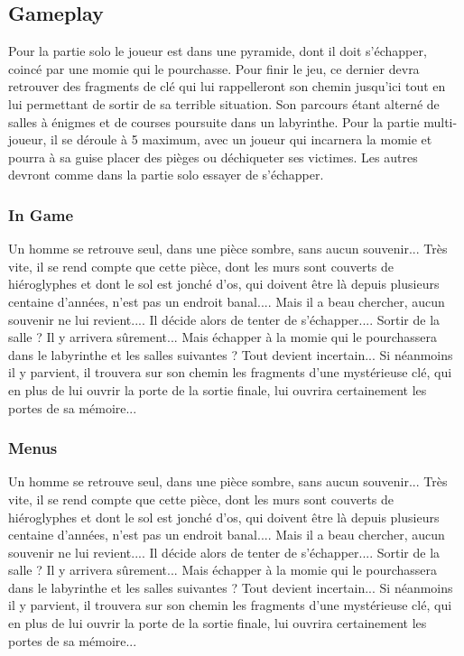 \documentclass[12pt,a4paper]{article}
\begin{document}
\newpage
\subsection{Gameplay}
Pour la partie solo le joueur est dans une pyramide, dont il doit s'échapper, coincé par une momie qui le pourchasse. Pour finir le jeu, ce dernier devra retrouver des fragments de clé qui lui rappelleront son chemin jusqu'ici tout en lui permettant de sortir de sa terrible situation. Son parcours étant alterné de salles à énigmes et de courses poursuite dans un labyrinthe.
Pour la partie multi-joueur, il se déroule à 5 maximum, avec un joueur qui incarnera la momie et pourra à sa guise placer des pièges ou déchiqueter ses victimes.
Les autres devront comme dans la partie solo essayer de s'échapper.
\subsubsection{In Game}
Un homme se retrouve seul, dans une pièce sombre, sans aucun souvenir...
Très vite, il se rend compte que cette pièce, dont les murs sont couverts de hiéroglyphes et dont le sol est jonché d'os, qui doivent être là depuis plusieurs centaine d'années, n'est pas un endroit banal....
Mais il a beau chercher, aucun souvenir ne lui revient....
Il décide alors de tenter de s'échapper....
Sortir de la salle ? Il y arrivera sûrement... Mais échapper à la momie qui le pourchassera dans le labyrinthe et les salles suivantes ? Tout devient incertain...
Si néanmoins il y parvient, il trouvera sur son chemin les fragments d'une mystérieuse clé, qui en plus de lui ouvrir la porte de la sortie finale, lui ouvrira certainement les portes de sa mémoire...
\newpage
\subsubsection{Menus}
Un homme se retrouve seul, dans une pièce sombre, sans aucun souvenir...
Très vite, il se rend compte que cette pièce, dont les murs sont couverts de hiéroglyphes et dont le sol est jonché d'os, qui doivent être là depuis plusieurs centaine d'années, n'est pas un endroit banal....
Mais il a beau chercher, aucun souvenir ne lui revient....
Il décide alors de tenter de s'échapper....
Sortir de la salle ? Il y arrivera sûrement... Mais échapper à la momie qui le pourchassera dans le labyrinthe et les salles suivantes ? Tout devient incertain...
Si néanmoins il y parvient, il trouvera sur son chemin les fragments d'une mystérieuse clé, qui en plus de lui ouvrir la porte de la sortie finale, lui ouvrira certainement les portes de sa mémoire...
\end{document}
